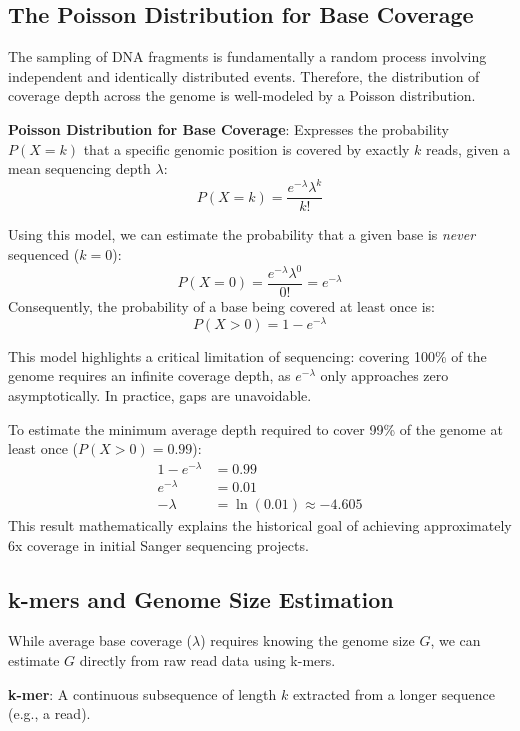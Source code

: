 \subsection{The Poisson Distribution for Base Coverage}
The sampling of DNA fragments is fundamentally a random process involving independent and identically distributed events. Therefore, the distribution of coverage depth across the genome is well-modeled by a Poisson distribution.

\begin{important}
    \textbf{Poisson Distribution for Base Coverage}: Expresses the probability \( P(X=k) \) that a specific genomic position is covered by exactly \( k \) reads, given a mean sequencing depth \( \lambda \):
    \[ P(X = k) = \frac{e^{-\lambda} \lambda^k}{k!} \]
\end{important}

Using this model, we can estimate the probability that a given base is \textit{never} sequenced (\( k=0 \)):
\[ P(X = 0) = \frac{e^{-\lambda} \lambda^0}{0!} = e^{-\lambda} \]
Consequently, the probability of a base being covered at least once is:
\[ P(X > 0) = 1 - e^{-\lambda} \]

\sta This model highlights a critical limitation of sequencing: covering 100\% of the genome requires an infinite coverage depth, as \( e^{-\lambda} \) only approaches zero asymptotically. In practice, gaps are unavoidable.

To estimate the minimum average depth required to cover 99\% of the genome at least once (\( P(X > 0) = 0.99 \)):
\begin{align*}
    1 - e^{-\lambda} &= 0.99 \\
    e^{-\lambda} &= 0.01 \\
    -\lambda &= \ln(0.01) \approx -4.605
\end{align*}
This result mathematically explains the historical goal of achieving approximately 6x coverage in initial Sanger sequencing projects.

\subsection{k-mers and Genome Size Estimation}
While average base coverage (\( \lambda \)) requires knowing the genome size \( G \), we can estimate \( G \) directly from raw read data using k-mers. 

\begin{important}
    \textbf{k-mer}: A continuous subsequence of length \( k \) extracted from a longer sequence (e.g., a read). 
\end{important}

